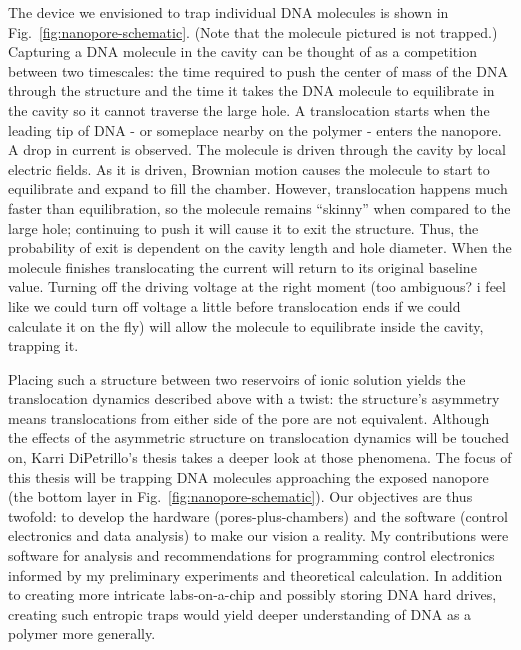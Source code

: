 \documentclass[aps,prl,preprint,groupedaddress]{revtex4}
\begin{document}
The device we envisioned to trap individual DNA molecules is shown in Fig.~\ref{fig:nanopore-schematic}. (Note that the molecule pictured is not trapped.) Capturing a DNA molecule in the cavity can be thought of as a competition between two timescales: the time required to push the center of mass of the DNA through the structure and the time it takes the DNA molecule to equilibrate in the cavity so it cannot traverse the large hole. A translocation starts when the leading tip of DNA  - or someplace nearby on the polymer - enters the nanopore. A drop in current is observed. The molecule is driven through the cavity by local electric fields. As it is driven, Brownian motion causes the molecule to start to equilibrate and expand to fill the chamber. However, translocation happens much faster than equilibration, so the molecule remains ``skinny'' when compared to the large hole; continuing to push it will cause it to exit the structure. Thus, the probability of exit is dependent on the cavity length and hole diameter. When the molecule finishes translocating the current will return to its original baseline value. Turning off the driving voltage at the right moment (too ambiguous? i feel like we could turn off voltage a little before translocation ends if we could calculate it on the fly) will allow the molecule to equilibrate inside the cavity, trapping it.

Placing such a structure between two reservoirs of ionic solution yields the translocation dynamics described above with a twist: the structure’s asymmetry means translocations from either side of the pore are not equivalent. Although the effects of the asymmetric structure on translocation dynamics will be touched on, Karri DiPetrillo's thesis takes a deeper look at those phenomena. The focus of this thesis will be trapping DNA molecules approaching the exposed nanopore (the bottom layer in Fig.~\ref{fig:nanopore-schematic}). Our objectives are thus twofold: to develop the hardware (pores-plus-chambers) and the software (control electronics and data analysis) to make our vision a reality. My contributions were software for analysis and recommendations for programming control electronics informed by my preliminary experiments and theoretical calculation. In addition to creating more intricate labs-on-a-chip and possibly storing DNA hard drives, creating such entropic traps would yield deeper understanding of DNA as a polymer more generally. 
\end{document}
